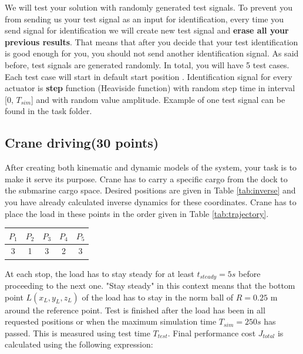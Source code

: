 \documentclass[openany]{book}
\begin{document}
	We will test your solution with randomly generated test signals. To prevent 
	you from sending us your test signal as an input for identification, every 
	time you send signal for identification we will create new test signal and 
	\textbf{erase all your previous results}. That means that after you decide 
	that your test identification is good enough for you, you should not send 
	another identification signal.
	As said before, test signals are generated randomly. In total, you will 
	have 5 test cases.  Each test case will start in default start position . 
	Identification signal for every actuator is \textbf{step} function  
	(Heaviside function) with random step time in interval [0, $T_{sim}$] and 
	with random value amplitude. Example of one test signal can be found in the 
	task folder.
	
	\subsection{Crane driving(30 points)}
	
	After creating both kinematic and dynamic models of the system, your task 
	is to make it serve its purpose. Crane has to carry a specific cargo from 
	the dock to the submarine cargo space. Desired positions are given in Table 
	\ref{tab:inverse} and you have already calculated inverse dynamics for 
	these coordinates. Crane has to place the load in these points in the order 
	given in Table \ref{tab:trajectory}.
	
	\begin{center}
		\label{tab:trajectory}
		\begin{tabular}{|| c c c c c ||}
			\hline
			$P_1$ & $P_2$ & $P_3$ & $P_4$ & $P_5$\\
			\hline\hline
			3 & 1 & 3 & 2 & 3  \\ 
			\hline
		\end{tabular}
	\end{center}
	
	\noindent
	At each stop, the load has to stay steady for at least $t_{steady} = 5s$ 
	before proceeding to the next one. "Stay steady" in this context means that 
	the bottom point $L(x_L,y_L,z_L)$ of the load has to stay in the norm ball 
	of $R = 0.25$ m around the reference point. Test is finished after the load 
	has been in all requested positions or when the maximum simulation time 
	$T_{sim} = 250s$ has passed. This is measured using test time $T_{test}$. 
	Final performance cost $J_{total}$ is calculated using the following 
	expression:
	
\end{document}
